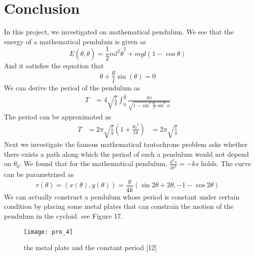 \documentclass{article}
\begin{document}
	\section{Conclusion}
 \par In this project, we investigated on mathematical pendulum. We see that the energy of a mathematical pendulum is given as 
 \begin{equation*}
E (\theta, \dot{\theta}) =  \frac{1}{2} m l^2 \dot{\theta}^2 + mgl(1- \cos\theta)
\end{equation*}
And it satisfies the equation that 
\begin{equation*}
\ddot{\theta}+\frac{g}{l}\sin(\theta) = 0
\end{equation*}
We can derive the period of the pendulum as 
\begin{equation*}
 \begin{aligned}
 T   & = 4\sqrt{\frac{l}{g}} \int_0^{\frac{\pi}{2}} \frac{d \phi}{\sqrt{1 - \sin^2 \frac{\theta_0}{2} \sin^2 \phi}}
 \end{aligned}
\end{equation*}
The period can be approximated as 
\begin{equation*}
 \begin{aligned}
 T & =   2\pi \sqrt{\frac{l}{g}} (1+\frac{{\theta_0} ^2}{16})
    & =  2\pi \sqrt{\frac{l}{g}}
  \end{aligned}
\end{equation*}
Next we investigate the famous mathematical tautochrone problem asks whether there exists a path along which the period of such a pendulum would not depend on $\theta_0$.
We found that for the mathematical pendulum, $\frac{d^2s}{dt^2} = -ks$ holds. 
The curve can be parametrized as 
  \begin{equation*}
    r(\theta)=(x(\theta),y(\theta))=\frac{g}{4k}(\sin 2\theta+2\theta, -1-\cos 2\theta)
    \end{equation*}
We can actually construct a pendulum whose period is constant under certain condition by placing some metal plates that can constrain the motion of the pendulum in the cycloid. see Figure 17.
\begin{figure}[H]
  \centering
  \texttt{[image: pro\_4]}
  \caption{the metal plate and the constant period [12]}
\end{figure}
\newpage
\end{document}

